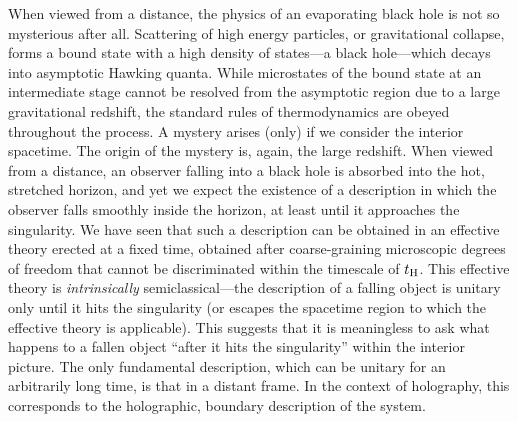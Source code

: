 \documentclass[12pt]{article}
\begin{document}
When viewed from a distance, the physics of an evaporating black hole 
is not so mysterious after all.  Scattering of high energy particles, 
or gravitational collapse, forms a bound state with a high density 
of states---a black hole---which decays into asymptotic Hawking 
quanta.  While microstates of the bound state at an intermediate 
stage cannot be resolved from the asymptotic region due to a large 
gravitational redshift, the standard rules of thermodynamics are 
obeyed~\cite{Bardeen:1973gs,Bekenstein:1974ax} throughout the 
process.  A mystery arises (only) if we consider the interior 
spacetime.  The origin of the mystery is, again, the large redshift. 
When viewed from a distance, an observer falling into a black hole 
is absorbed into the hot, stretched horizon, and yet we expect the 
existence of a description in which the observer falls smoothly 
inside the horizon, at least until it approaches the singularity. 
We have seen that such a description can be obtained in an effective 
theory erected at a fixed time, obtained after coarse-graining 
microscopic degrees of freedom that cannot be discriminated 
within the timescale of $t_{\rm H}$.  This effective theory is 
{\it intrinsically} semiclassical---the description of a falling 
object is unitary only until it hits the singularity (or escapes 
the spacetime region to which the effective theory is applicable). 
This suggests that it is meaningless to ask what happens to a 
fallen object ``after it hits the singularity'' within the interior 
picture.  The only fundamental description, which can be unitary 
for an arbitrarily long time, is that in a distant frame.  In the 
context of holography, this corresponds to the holographic, boundary 
description of the system.
\end{document}
